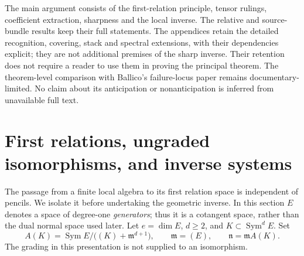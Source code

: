 \documentclass[11pt,reqno]{amsart}
\numberwithin{equation}{section}
\theoremstyle{definition}\newtheorem{definition}[theorem]{Definition}
\theoremstyle{remark}\newtheorem{remark}[theorem]{Remark}
\DeclareMathOperator{\Sym}{Sym}\DeclareMathOperator{\Gr}{Gr}
\begin{document}
The main argument consists of the first-relation principle, tensor
rulings, coefficient extraction, sharpness and the local inverse. The
relative and source-bundle results keep their full statements.
The appendices retain the detailed recognition, covering, stack and
spectral extensions, with their dependencies explicit; they are not
additional premises of the sharp inverse. Their retention does not
require a reader to use them in proving the principal theorem.
The theorem-level comparison with Ballico's failure-locus paper
\cite{Ballico93} remains documentary-limited. No claim about its
anticipation or nonanticipation is inferred from unavailable full text.

\section{First relations, ungraded isomorphisms, and inverse systems}
\label{sec:first-relations-v147}

The passage from a finite local algebra to its first relation space is
independent of pencils.  We isolate it before undertaking the geometric
inverse.  In this section \(E\) denotes a space of degree-one
\emph{generators}; thus it is a cotangent space, rather than the dual
normal space used later.  Let \(e=\dim E\), \(d\ge2\), and
\(K\subset\Sym^d E\).  Set
\begin{equation}\label{eq:general-first-algebra-v147}
 A(K)=\Sym E/\bigl((K)+\mathfrak m^{d+1}\bigr),
 \qquad \mathfrak m=(E),\qquad \mathfrak n=\mathfrak m A(K).
\end{equation}
The grading in this presentation is not supplied to an isomorphism.
\end{document}
